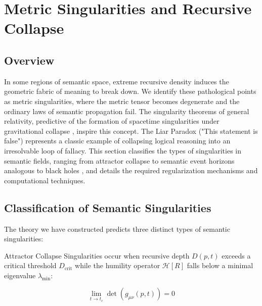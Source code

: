 \chapter{Metric Singularities and Recursive Collapse}
\label{12:metric_singularities_and_recursive_collapse}


\section{Overview}
\label{12.1:overview}

In some regions of semantic space, extreme recursive density induces the geometric fabric of meaning to break down. We identify these pathological points as metric singularities, where the metric tensor becomes degenerate and the ordinary laws of semantic propagation fail. The singularity theorems of general relativity, predictive of the formation of spacetime singularities under gravitational collapse \autocite{Penrose1965}, inspire this concept. The Liar Paradox ("This statement is false") represents a classic example of collapsing logical reasoning into an irresolvable loop of fallacy. This section classifies the types of singularities in semantic fields, ranging from attractor collapse to semantic event horizons analogous to black holes \autocite{Hawking1974}, and details the required regularization mechanisms and computational techniques.


\section{Classification of Semantic Singularities}
\label{12.2:classification_of_semantic_singularities}

The theory we have constructed predicts three distinct types of semantic singularities:

Attractor Collapse Singularities occur when recursive depth \(D(p, t)\) exceeds a critical threshold \(D_{\text{crit}}\) while the humility operator \(\mathcal{H}[R]\) falls below a minimal eigenvalue \(\lambda_{\text{min}}\):

\begin{equation}
\lim_{t \to t_c} \det(g_{\mu\nu}(p, t)) = 0
\end{equation}

